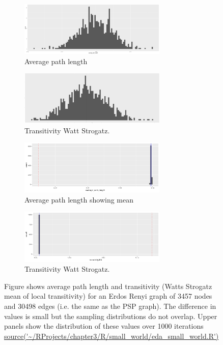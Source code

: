 \begin{figure}
  \begin{subfigure}{7cm}
    \centering\includegraphics[width=7cm]{images/chapter3/small_world_histogram/Rplot_average_path_length.png}
    \caption{Average path length}
    \end{subfigure}
  \begin{subfigure}{7cm}
    \centering\includegraphics[width=7cm]{images/chapter3/small_world_histogram/Rplot_transitivityWS_ER_graph3457.png}
    \caption{Transitivity Watt Strogatz.}
  \end{subfigure}

 
 \begin{subfigure}{7cm}
    \centering\includegraphics[width=7cm]{images/chapter3/small_world_histogram/Rplot_average_pathlmean.png}
    \caption{Average path length showing mean}
    \end{subfigure}
  \begin{subfigure}{7cm}
    \centering\includegraphics[width=7cm]{images/chapter3/small_world_histogram/Rplot_transitivity_mean.png}
    \caption{Transitivity Watt Strogatz.}
  \end{subfigure}
\caption{Figure shows average path length and transitivity (Watts Strogatz mean of local transitivity) for an Erdos Renyi graph of 3457 nodes and 30498 edges (i.e. the same as the PSP graph). The difference in values is small but the sampling distributions do not overlap. Upper panels show the distribution of these values over 1000 iterations \url{source('~/RProjects/chapter3/R/small_world/eda_small_world.R')}}
 
  \end{figure}

